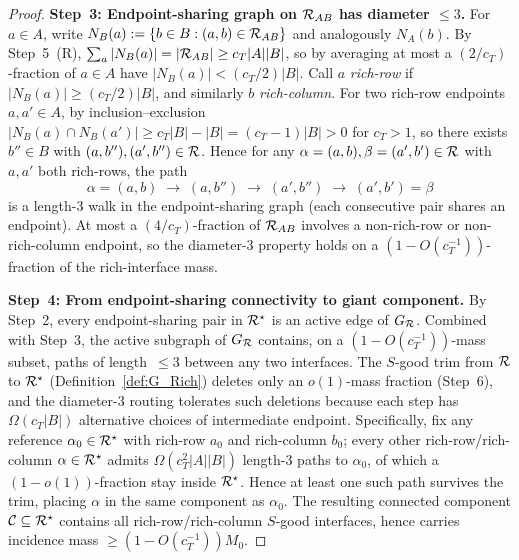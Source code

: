 \begin{proof}
\smallskip
\textbf{Step~3: Endpoint-sharing graph on $\mathcal{R}_{AB}$ has diameter
$\le 3$.}  For $a\in A$, write $N_B(a):=\{b\in B:(a,b)\in\mathcal{R}_{AB}\}$
and analogously $N_A(b)$.  By Step~5~(R), $\sum_a|N_B(a)|=|\mathcal{R}_{AB}|
\ge c_T|A||B|$, so by averaging at most a $(2/c_T)$-fraction of
$a\in A$ have $|N_B(a)|<(c_T/2)|B|$.  Call $a$ \emph{rich-row} if
$|N_B(a)|\ge(c_T/2)|B|$, and similarly $b$ \emph{rich-column}.
For two rich-row endpoints $a,a'\in A$, by inclusion--exclusion
$|N_B(a)\cap N_B(a')|\ge c_T|B|-|B|=(c_T-1)|B|>0$ for $c_T>1$, so
there exists $b''\in B$ with $(a,b''),(a',b'')\in\mathcal{R}$.  Hence for any
$\alpha=(a,b),\beta=(a',b')\in\mathcal{R}$ with $a,a'$ both rich-rows, the
path
\[
  \alpha=(a,b)\;\longrightarrow\;(a,b'')\;\longrightarrow\;(a',b'')\;
  \longrightarrow\;(a',b')=\beta
\]
is a length-$3$ walk in the endpoint-sharing graph (each consecutive
pair shares an endpoint).  At most a $(4/c_T)$-fraction of
$\mathcal{R}_{AB}$ involves a non-rich-row or non-rich-column endpoint, so
the diameter-$3$ property holds on a $(1-O(c_T^{-1}))$-fraction of
the rich-interface mass.

\smallskip
\textbf{Step~4: From endpoint-sharing connectivity to giant
component.}  By Step~2, every endpoint-sharing pair in $\mathcal{R}^\star$
is an active edge of $G_{\mathcal{R}}$.  Combined with Step~3, the active
subgraph of $G_{\mathcal{R}}$ contains, on a $(1-O(c_T^{-1}))$-mass
subset, paths of length~$\le 3$ between any two interfaces.  The
$S$-good trim from $\mathcal{R}$ to $\mathcal{R}^\star$
(Definition~\ref{def:G_Rich}) deletes only an $o(1)$-mass fraction
(Step~6), and the diameter-$3$ routing tolerates such deletions
because each step has $\Omega(c_T|B|)$ alternative choices of
intermediate endpoint.  Specifically, fix any reference
$\alpha_0\in\mathcal{R}^\star$ with rich-row $a_0$ and rich-column $b_0$;
every other rich-row/rich-column $\alpha\in\mathcal{R}^\star$ admits
$\Omega(c_T^2|A||B|)$ length-$3$ paths to $\alpha_0$, of which a
$(1-o(1))$-fraction stay inside $\mathcal{R}^\star$.  Hence at least one
such path survives the trim, placing $\alpha$ in the same component
as $\alpha_0$.  The resulting connected component
$\mathcal{C}\subseteq\mathcal{R}^\star$ contains all rich-row/rich-column
$S$-good interfaces, hence carries incidence mass
$\ge(1-O(c_T^{-1}))M_0$.


\end{proof}
